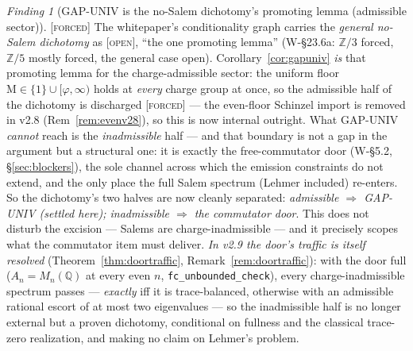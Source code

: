 \documentclass[11pt]{article}
\newcommand{\tagF}{\textcolor{cF}{\textsc{[forced]}}}
\newcommand{\tagO}{\textcolor{cO}{\textsc{[open]}}}
\newcommand{\Q}{\mathbb{Q}}
\newcommand{\Z}{\mathbb{Z}}
\newcommand{\gp}{\varphi}
\newcommand{\M}{\mathrm{M}}
\theoremstyle{plain}
\theoremstyle{definition}
\theoremstyle{remark}
\newtheorem{finding}[theorem]{Finding}
\begin{document}
\begin{finding}[GAP-UNIV is the no-Salem dichotomy's promoting lemma (admissible sector)]\label{find:gapdichotomy}\tagF{}
The whitepaper's conditionality graph carries the \emph{general no-Salem
dichotomy} as \tagO{}, ``the one promoting lemma'' (W-\S23.6a: $\Z/3$ forced,
$\Z/5$ mostly forced, the general case open). Corollary~\ref{cor:gapuniv} \emph{is}
that promoting lemma for the charge-admissible sector: the uniform floor
$\M\in\{1\}\cup[\gp,\infty)$ holds at \emph{every} charge group at once, so the
admissible half of the dichotomy is discharged \tagF{} --- the even-floor Schinzel
import is removed in v2.8 (Rem~\ref{rem:evenv28}), so this is now internal outright. What GAP-UNIV
\emph{cannot} reach is the \emph{inadmissible} half --- and that boundary is not a
gap in the argument but a structural one: it is exactly the free-commutator door
(W-\S5.2, \S\ref{sec:blockers}), the sole channel across which the emission
constraints do not extend, and the only place the full Salem spectrum (Lehmer
included) re-enters. So the dichotomy's two halves are now cleanly separated:
\emph{admissible $\Rightarrow$ GAP-UNIV (settled here); inadmissible $\Rightarrow$
the commutator door}. This does not disturb the excision --- Salems
are charge-inadmissible --- and it precisely scopes what the commutator item must
deliver. \emph{In v2.9 the door's \emph{traffic} is itself resolved}
(Theorem~\ref{thm:doortraffic}, Remark~\ref{rem:doortraffic}): with the door full
($A_n=M_n(\Q)$ at every even $n$, \texttt{fc\_unbounded\_check}), every
charge-inadmissible spectrum passes --- \emph{exactly} iff it is trace-balanced,
otherwise with an admissible rational escort of at most two eigenvalues --- so the
inadmissible half is no longer external but a proven dichotomy, conditional on
fullness and the classical trace-zero realization, and making no claim on Lehmer's
problem.
\end{finding}
\end{document}
